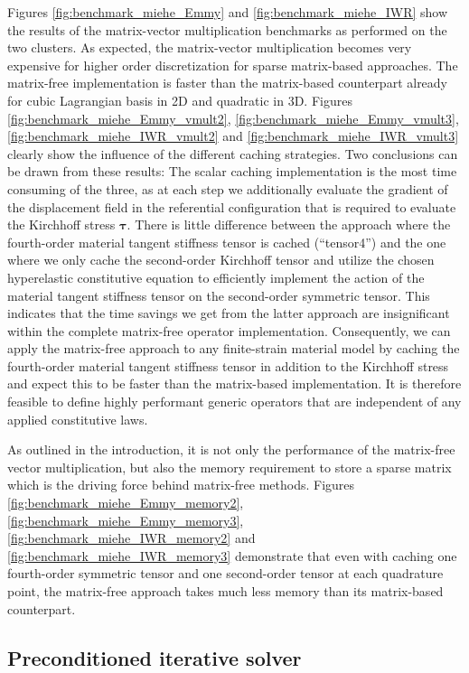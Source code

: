 \documentclass[preprint,12pt,times]{elsarticle}
\def\gz  #1{           \mbox{$\boldsymbol{#1}$}}
\begin{document}
Figures \ref{fig:benchmark_miehe_Emmy} and \ref{fig:benchmark_miehe_IWR} show the results of the matrix-vector multiplication benchmarks as performed on the two clusters.
As expected, the matrix-vector multiplication becomes very expensive for higher order discretization for sparse matrix-based approaches.
The matrix-free implementation is faster than the matrix-based counterpart already for cubic Lagrangian basis in 2D and quadratic in 3D.
Figures \ref{fig:benchmark_miehe_Emmy_vmult2}, \ref{fig:benchmark_miehe_Emmy_vmult3}, \ref{fig:benchmark_miehe_IWR_vmult2} and \ref{fig:benchmark_miehe_IWR_vmult3} clearly show the influence of the different caching strategies.
Two conclusions can be drawn from these results:
The scalar caching implementation is the most time consuming of the three, as at each step we additionally evaluate the gradient of the displacement field in the {\color{red}referential} configuration that is required to evaluate the Kirchhoff stress $\gz \tau$.
There is little difference between the approach where the fourth-order material tangent {\color{red}stiffness} tensor is cached (``tensor4'') and the one where we only cache the second-order Kirchhoff tensor and utilize the chosen hyperelastic constitutive equation to efficiently implement the action of the material tangent {\color{red}stiffness tensor} on the second-order symmetric tensor.
This indicates that the time savings we get from the latter approach are insignificant within the complete matrix-free operator implementation.
Consequently, we can apply the matrix-free approach to any finite-strain material model by caching the fourth-order material tangent {\color{red}stiffness tensor} in addition to the Kirchhoff stress and expect this to be faster than the matrix-based implementation.
It is therefore feasible to define highly performant generic operators that are independent of any applied constitutive laws.

As outlined in the introduction, it is not only the performance of the matrix-free vector multiplication, but also the memory requirement to store a sparse matrix which is the driving force behind matrix-free methods.
Figures \ref{fig:benchmark_miehe_Emmy_memory2}, \ref{fig:benchmark_miehe_Emmy_memory3}, \ref{fig:benchmark_miehe_IWR_memory2} and \ref{fig:benchmark_miehe_IWR_memory3} demonstrate that even with caching one fourth-order symmetric tensor and one second-order tensor at each quadrature point, the matrix-free approach takes much less memory than its matrix-based counterpart.

\subsection{Preconditioned iterative solver}
\end{document}

